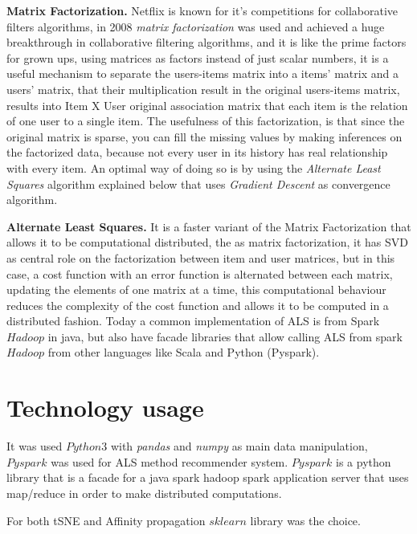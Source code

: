 \documentclass[ecp,tc,english]{iiufrgs}
\begin{document}
    \textbf{Matrix Factorization.} Netflix is known for it's competitions for collaborative filters algorithms, in 2008 \textit{matrix factorization} \cite{srebro2004} was used and achieved a huge breakthrough in collaborative filtering algorithms, and it is like the prime factors for grown ups, using matrices as factors instead of just scalar numbers, it is a useful mechanism to separate the users-items matrix into a items' matrix and a users' matrix, that their multiplication result in the original users-items matrix, results into Item X User original association matrix that each item is the relation of one user to a single item.
    The usefulness of this factorization, is that since the original matrix is sparse, you can fill the missing values by making inferences on the factorized data, because not every user in its history has real relationship with every item.
    An optimal way of doing so is by using the \textit{Alternate Least Squares} algorithm explained below that uses  \textit{Gradient Descent} as convergence algorithm.
    
    
    \textbf{Alternate Least Squares.} It is a faster variant of the Matrix Factorization that allows it to be computational distributed, the as matrix factorization, it has SVD as central role on the factorization between item and user matrices, but in this case, a cost function with an error function is alternated between each matrix, updating the elements of one matrix at a time, this computational behaviour reduces the complexity of the cost function and allows it to be computed in a distributed fashion.
    Today a common implementation of ALS is from Spark \(Hadoop\) in java, but also have facade libraries that allow calling ALS from spark \(Hadoop\) from other languages like Scala and Python (Pyspark).

    \section{Technology usage} \label{technology_usage}

    It was used \(Python3\) with \textit{pandas} \cite{reback2020pandas} and \textit{numpy} as main data manipulation, \(Pyspark\) was used for ALS method recommender system. 
    \(Pyspark\) is a python library that is a facade for a java spark hadoop spark application server that uses map/reduce in order to make distributed computations.

    For both tSNE and Affinity propagation \(sklearn\) library was the choice.
        
\end{document}
